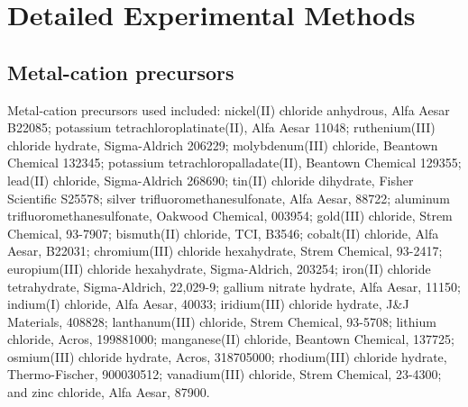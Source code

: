 \documentclass[journal=accacs,manuscript=suppinfo]{achemso}
\begin{document}
\tableofcontents

\section{Detailed Experimental Methods}
\subsection{Metal-cation precursors}
Metal-cation precursors used included: nickel(II) chloride anhydrous, Alfa Aesar B22085; potassium tetrachloroplatinate(II), Alfa Aesar 11048; ruthenium(III) chloride hydrate, Sigma-Aldrich 206229; molybdenum(III) chloride, Beantown Chemical 132345; potassium tetrachloropalladate(II), Beantown Chemical 129355; lead(II) chloride, Sigma-Aldrich 268690; tin(II) chloride dihydrate, Fisher Scientific S25578; silver trifluoromethanesulfonate, Alfa Aesar, 88722; aluminum trifluoromethanesulfonate, Oakwood Chemical, 003954; gold(III) chloride, Strem Chemical, 93-7907; bismuth(II) chloride, TCI, B3546; cobalt(II) chloride, Alfa Aesar, B22031; chromium(III) chloride hexahydrate, Strem Chemical, 93-2417; europium(III) chloride hexahydrate, Sigma-Aldrich, 203254; iron(II) chloride tetrahydrate, Sigma-Aldrich, 22,029-9; gallium nitrate hydrate, Alfa Aesar, 11150; indium(I) chloride, Alfa Aesar, 40033; iridium(III) chloride hydrate, J\&J Materials, 408828; lanthanum(III) chloride, Strem Chemical, 93-5708; lithium chloride, Acros, 199881000; manganese(II) chloride, Beantown Chemical, 137725; osmium(III) chloride hydrate, Acros, 318705000; rhodium(III) chloride hydrate, Thermo-Fischer, 900030512; vanadium(III) chloride, Strem Chemical, 23-4300; and zinc chloride, Alfa Aesar, 87900.
\end{document}
